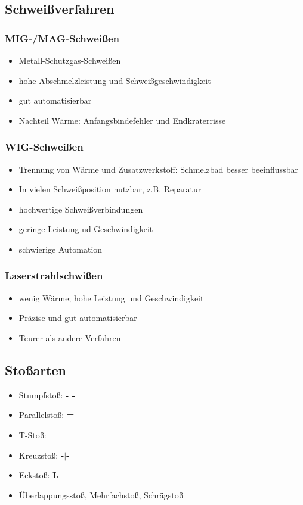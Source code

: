 \documentclass[a4paper,DIV=15,fontsize=11pt]{scrartcl}
\begin{document}
\subsection{Schweißverfahren}
\subsubsection{MIG-/MAG-Schweißen}
\begin{itemize}
	\item Metall-Schutzgas-Schweißen
	\item hohe Abschmelzleistung und Schweißgeschwindigkeit
	\item gut automatisierbar
	\item Nachteil Wärme: Anfangsbindefehler und Endkraterrisse
\end{itemize}
	
\subsubsection{WIG-Schweißen}
\begin{itemize}
	\item Trennung von Wärme und Zusatzwerkstoff: Schmelzbad besser beeinflussbar
	\item In vielen Schweißposition nutzbar, z.B. Reparatur
	\item hochwertige Schweißverbindungen
	\item geringe Leistung ud Geschwindigkeit
	\item schwierige Automation
\end{itemize}

\subsubsection{Laserstrahlschwißen}
\begin{itemize}
	\item wenig Wärme; hohe Leistung und Geschwindigkeit
	\item Präzise und gut automatisierbar
	\item Teurer als andere Verfahren
\end{itemize}

\subsection{Stoßarten}
\begin{itemize}
	\item Stumpfstoß: \textbf{- -}
	\item Parallelstoß: \textbf{=}
	\item T-Stoß: $\bot$
	\item Kreuzstoß: \textbf{-$\mid$-}
	\item Eckstoß: \textbf{L}
	\item Überlappungsstoß, Mehrfachstoß, Schrägstoß
\end{itemize}
	
\end{document}
